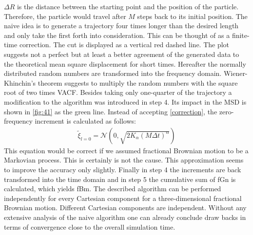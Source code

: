 \documentclass[
  a4paper,BCOR10mm,oneside,
  headsepline,footsepline,%
  fleqn,openbib
]{scrbook}
\begin{document}
$\Delta R $ is the distance between the starting point and the position of the particle. Therefore, the particle would travel after $M$ steps back to its initial position. The naive idea is to generate a trajectory four times longer than the desired length and only take the first forth into consideration. This can be thought of as a finite-time correction. The cut is displayed as a vertical red dashed line. The plot suggests not a perfect but at least a better agreement of the generated data to the theoretical mean square displacement for short times. Hereafter the normally distributed random numbers are transformed into the frequency domain. Wiener-Khinchin's theorem suggests to multiply the random numbers with the square root of two times VACF. Besides taking only one-quarter of the trajectory a modification to the algorithm was introduced in step 4. Its impact in the MSD is shown in \cref{fig:41} as the green line. Instead of accepting  \cref{correction}, the zero-frequency increment is calculated as follows:
\begin{align}
 \tilde{\xi}_{l=0} = \mathcal{N}(0,\sqrt{2 K_{\alpha} (M \Delta t)^\alpha})
\end{align}
This equation would be correct if we assumed fractional Brownian motion to be a Markovian process. This is certainly is not the cause. This approximation seems to improve the accuracy only slightly.
Finally in step 4 the increments are back transformed into the time domain and in step 5 the cumulative sum of fGn is calculated, which yields fBm. The described algorithm can be performed independently for every Cartesian component for a three-dimensional fractional Brownian motion. Different Cartesian components are independent. Without any extensive analysis of the naive algorithm one can already conclude draw backs in terms of convergence close to the overall simulation time. 
\end{document}
